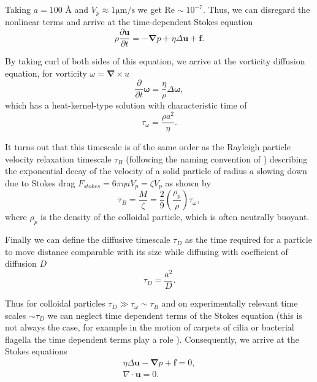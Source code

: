 \documentclass{doctoral}
\newcommand{\pd}{\partial}
\newcommand{\Reynolds}{\mathrm{Re}}
\begin{document}
Taking $a = 100$ \AA{} and $V_p \approx 1 \mathrm{\mu m / s}$  we get $\Reynolds \sim 10^{-7}$.
Thus, we can disregard the nonlinear terms and arrive at the time-dependent Stokes equation
\begin{equation}
    \rho \frac{\pd \bm{u}}{\pd t} = - \bm{\nabla} p + \eta \Delta \bm{u} + \bm{f}.
    \label{eqn:time-dependent-stokes-equation}
\end{equation}

By taking curl of both sides of this equation, we arrive at the vorticity diffusion equation, for vorticity $\omega = \bm{\nabla} \times u$
\begin{equation}
    \frac{\pd}{\pd t} \bm{\omega}  = \frac{\eta}{\rho} \Delta \bm{\omega} , \label{eqn:vorticity-diffusion}
\end{equation}
which has a heat-kernel-type solution with characteristic time of
\begin{equation}
    \tau_\omega = \frac{\rho a^2}{\eta}.
    \label{eqn:vorticity-timescale}
\end{equation}

It turns out that this timescale is of the same order as the Rayleigh particle velocity relaxation timescale $\tau_B$ (following the naming convention of \textcite{vanKampen_2011}) describing the exponential decay of the velocity of a solid particle of radius $a$ slowing down due to Stokes drag $F_{stokes} = 6 \pi \eta a V_p = \zeta V_p$ as shown by
\begin{equation}
    \tau_B = \frac{M}{\zeta} = \frac{2}{9} \left( \frac{\rho_p}{\rho} \right) \tau_\omega, \label{eqn:raighley-timescale}
\end{equation}
where $\rho_p$ is the density of the colloidal particle, which is often neutrally buoyant.

Finally we can define the diffusive timescale $\tau_D$ as the time required for a particle to move distance comparable with its size while diffusing with coefficient of diffusion $D$
\begin{equation}
    \tau_D = \frac{a^2}{D}.
    \label{eqn:diffusive-timescale}
\end{equation}

Thus for colloidal particles $\tau_D \gg \tau_\omega \sim \tau_B$ and on experimentally relevant time scales $\sim \tau_D$ we can neglect time dependent terms of the Stokes equation (this is not always the case, for example in the motion of carpets of cilia or bacterial flagella the time dependent terms play a role \cite{Wei_2021}).
Consequently, we arrive at the Stokes equations
\begin{eqnarray}
    \eta \Delta \bm{u} - \bm{\nabla} p + \bm{f} = 0, \label{eqn:stokes-equation} \\
    \nabla \cdot \bm{u} = 0.
\end{eqnarray}
\end{document}
